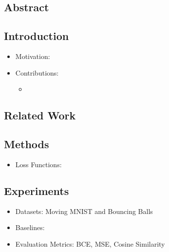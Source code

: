 \documentclass{article}
\begin{document}
    \subsection*{Abstract}

    \subsection{Introduction}\label{subsec:Learning_to_Decompose_and_Disentangle_Representations_for_Video_Prediction_(DDPAE):introduction}
    \begin{itemize}
        \item Motivation:
        \item Contributions:
        \begin{itemize}
            \item
        \end{itemize}
    \end{itemize}

    \subsection{Related Work}\label{subsec:Learning_to_Decompose_and_Disentangle_Representations_for_Video_Prediction_(DDPAE):related-work}

    \subsection{Methods}\label{subsec:Learning_to_Decompose_and_Disentangle_Representations_for_Video_Prediction_(DDPAE):methods}
    \begin{itemize}
        \item Loss Functions:
    \end{itemize}

    \subsection{Experiments}\label{subsec:Learning_to_Decompose_and_Disentangle_Representations_for_Video_Prediction_(DDPAE):experiments}
    \begin{itemize}
        \item Datasets: Moving MNIST and Bouncing Balls
        \item Baselines:
        \item Evaluation Metrics: BCE, MSE, Cosine Similarity
    \end{itemize}
    \newpage
\end{document}
